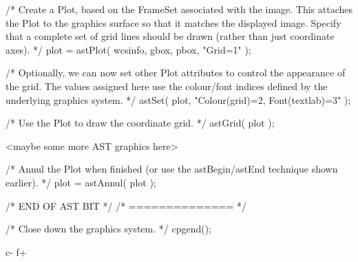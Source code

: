 \documentclass[twoside,11pt]{starlink}
\begin{document}
\begin{terminalv}
{{/* Create a Plot, based on the FrameSet associated with the
   image. This attaches the Plot to the graphics surface so that it
   matches the displayed image. Specify that a complete set of grid
   lines should be drawn (rather than just coordinate axes). */
      plot = astPlot( wcsinfo, gbox, pbox, "Grid=1" );
   }

/* Optionally, we can now set other Plot attributes to control the
   appearance of the grid. The values assigned here use the
   colour/font indices defined by the underlying graphics system. */
   astSet( plot, "Colour(grid)=2, Font(textlab)=3" );

/* Use the Plot to draw the coordinate grid. */
   astGrid( plot );

   <maybe some more AST graphics here>

/* Annul the Plot when finished (or use the astBegin/astEnd technique
   shown earlier). */
   plot = astAnnul( plot );

/* END OF AST BIT */
/* ============== */

/* Close down the graphics system. */
   cpgend();
}
\end{terminalv}
\normalsize
c-
f+
\small
\end{document}
